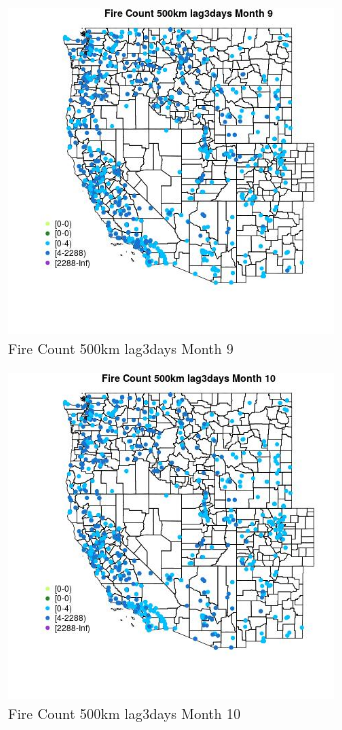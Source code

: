 \begin{figure} 
\centering  
\includegraphics[width=0.77\textwidth]{Code_Outputs/Report_ML_input_PM25_Step4_part_e_de_duplicated_aves_compiled_2019-05-21wNAs_MapObsMo9Fire_Count_500km_lag3days.jpg} 
\caption{\label{fig:Report_ML_input_PM25_Step4_part_e_de_duplicated_aves_compiled_2019-05-21wNAsMapObsMo9Fire_Count_500km_lag3days}Fire Count 500km lag3days Month 9} 
\end{figure} 
 

\begin{figure} 
\centering  
\includegraphics[width=0.77\textwidth]{Code_Outputs/Report_ML_input_PM25_Step4_part_e_de_duplicated_aves_compiled_2019-05-21wNAs_MapObsMo10Fire_Count_500km_lag3days.jpg} 
\caption{\label{fig:Report_ML_input_PM25_Step4_part_e_de_duplicated_aves_compiled_2019-05-21wNAsMapObsMo10Fire_Count_500km_lag3days}Fire Count 500km lag3days Month 10} 
\end{figure} 
 

